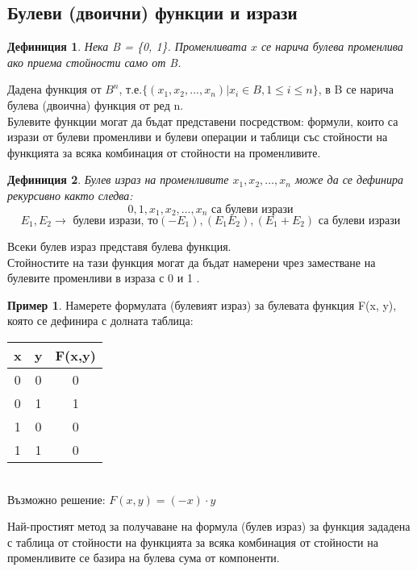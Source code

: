 \documentclass[fleqn, 12pt]{article}
\newtheorem{definition}{Дефиниция}[subsection]
\theoremstyle{definition}
\newtheorem{example}{Пример}[subsection]
\begin{document}
\subsection{Булеви (двоични) функции и изрази}
\begin{definition}
Нека B = \{0, 1\}. Променливата $x$ се нарича булева променлива ако приема стойности само от B.
\end{definition}
Дадена функция от $B^n$, т.е.$\{(x_1, x_2, ..., x_n) \vert x_i \in B, 1 \leq i \leq n\}$, в B се нарича булева (двоична) функция от ред n.\\
Булевите функции могат да бъдат представени посредством: формули, които са изрази от булеви променливи и булеви операции и таблици със стойности на функцията за всяка комбинация от стойности на променливите.
\begin{definition}
Булев израз на променливите $x_1, x_2, ..., x_n$ може да се дефинира рекурсивно както следва:
$$0,1,x_1, x_2,..., x_n \text{ са булеви изрази}$$
$$E_1, E_2 \to \text{ булеви изрази, то} (-E_1), (E_1E_2), (E_1+E_2)  \text{ са булеви изрази}$$
\end{definition}
Всеки булев израз представя булева функция. \\
Стойностите на тази функция могат да бъдат намерени чрез заместване на булевите променливи в израза с 0 и 1 .
\begin{example}
Намерете формулата (булевият израз) за булевата функция F(x, y), която се дефинира с долната таблица:
\begin{table}[h!]
  \begin{center}
    \begin{tabular}{|c|c|c|} 
\hline
      \textbf{x} &  \textbf{y} &  \textbf{F(x,y)}\\
\hline
	0 & 0 & 0\\ 
\hline
	0 & 1 & 1\\
\hline
	1& 0 & 0\\
\hline
 	1 &1 & 0 \\  
\hline
    \end{tabular}
  \end{center}
\end{table}
\\
Възможно решение: $F(x,y) = (-x) \cdot y$
\end{example}
Най-простият метод за получаване на формула (булев израз) за функция зададена с таблица от стойности на функцията за всяка комбинация от стойности на променливите се базира на булева сума от компоненти.\\
\end{document}
